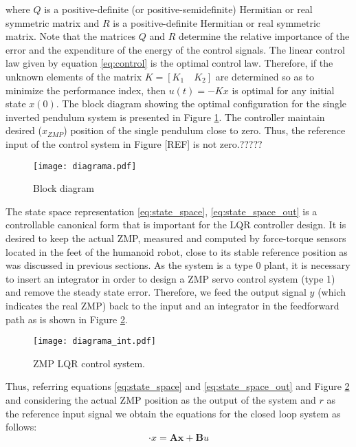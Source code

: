 where $Q$ is a positive-definite (or positive-semidefinite) Hermitian or real symmetric matrix and $R$ is a positive-definite Hermitian or real symmetric matrix. Note that the matrices $Q$ and $R$ determine the relative importance of the error and the expenditure of the energy of the control signals.
The linear control law given by equation \ref{eq:control} is the optimal control law. Therefore, if the unknown elements of the matrix $K = [K_1 \quad K_2]$ are determined so as to minimize the performance index, then $u(t) = -Kx$  is optimal for any initial state $x(0)$. The block diagram showing the optimal configuration for the single inverted pendulum system is presented in Figure \ref{fig:block_diagram}. The controller maintain desired ($x_{ZMP}$) position of the single pendulum close to zero. Thus, the reference input of the control system in Figure [REF] is not zero.?????
\begin{figure}[!hbt]
\centering
\texttt{[image: diagrama.pdf]}
\caption{Block diagram}
\label{fig:block_diagram}
\end{figure}

The state space representation \ref{eq:state_space}, \ref{eq:state_space_out} is a controllable canonical form that is important for the LQR controller design. It is desired to keep the actual ZMP, measured and computed by force-torque sensors located in the feet of the humanoid robot, close to its stable reference position as was discussed in previous sections. As the system is a type 0 plant, it is necessary to insert an integrator in order to design a ZMP servo control system (type 1) and remove the steady state error. Therefore, we feed the output signal $y$ (which indicates the real ZMP) back to the input and an integrator in the feedforward path as is shown in Figure \ref{fig:diagrama_int}.

\begin{figure}[!hbt]
\centering
\texttt{[image: diagrama\_int.pdf]}
\caption{ZMP LQR control system.}
\label{fig:diagrama_int}
\end{figure}

Thus, referring equations \ref{eq:state_space} and \ref{eq:state_space_out} and Figure \ref{fig:diagrama_int} and considering the actual ZMP position as the output of the system and $r$ as the reference input signal we obtain the equations for the closed loop system as follows:
\begin{equation}
\cdot x = \textbf{A}\textbf{x} + \textbf{B}u
\end{equation}

